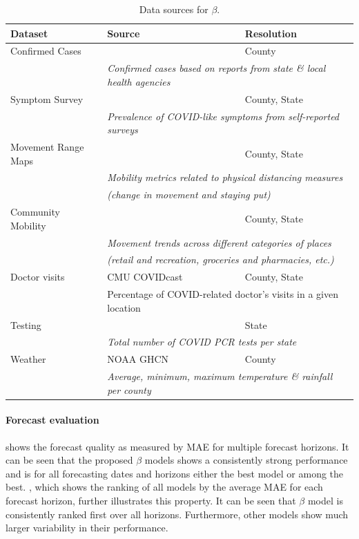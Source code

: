 \documentclass[nobib]{tufte-handout}
\newcommand{\bAR}{\ensuremath{\beta}\text{-AR}\xspace}
\begin{document}
\begin{table}[t]
\small
\centering
\begin{tabular}{lll}
\toprule
\bf Dataset & \bf Source & \bf Resolution \\
\midrule
Confirmed Cases &  \citet{data/nytimes_cases} &  County \\
& \multicolumn{2}{l}{\it Confirmed cases based on reports from state \& local health agencies} \\
\midrule
Symptom Survey & \citet{data/fb_symptom_survey} &  County, State \\
& \multicolumn{2}{l}{\it Prevalence of COVID-like symptoms from self-reported surveys} \\
\midrule
Movement Range Maps &  \citet{data/fb_movement_range} &  County, State \\
& \multicolumn{2}{l}{\it Mobility metrics related to physical distancing measures} \\
& \multicolumn{2}{l}{\it (change in movement and staying put)} \\
\midrule
Community Mobility & \citet{data/google_mobility} &  County, State \\
& \multicolumn{2}{l}{\it Movement trends across different categories of places} \\
& \multicolumn{2}{l}{\it (retail and recreation, groceries and pharmacies, etc.)} \\
\midrule
Doctor visits & CMU COVIDcast \citep{data/covidcast} & County, State \\
& \multicolumn{2}{l}{Percentage of COVID-related doctor’s visits in a given location} \\
\midrule
Testing &  \citet{data/covidtracking} & State \\
& \multicolumn{2}{l}{\it Total number of COVID PCR tests per state} \\
\midrule
Weather & NOAA GHCN \citep{data/menne2012overview} &  County \\
& \multicolumn{2}{l}{\it Average, minimum, maximum temperature \& rainfall per county} \\
\bottomrule
\end{tabular}
\vspace*{2em}
\caption{Data sources for \bAR.\label{tab:data-sources}}
\end{table}

\paragraph{Forecast evaluation}  shows the forecast
quality as measured by MAE for multiple forecast horizons. It can be seen that
the proposed \bAR models shows a consistently strong performance and is for all
forecasting dates and horizons either the best model or among the best.
, which shows the ranking of all models by the
average MAE for each forecast horizon, further illustrates this property. It can
be seen that \bAR model is consistently ranked first over all horizons.
Furthermore, other models show much larger variability in their performance.
\end{document}
